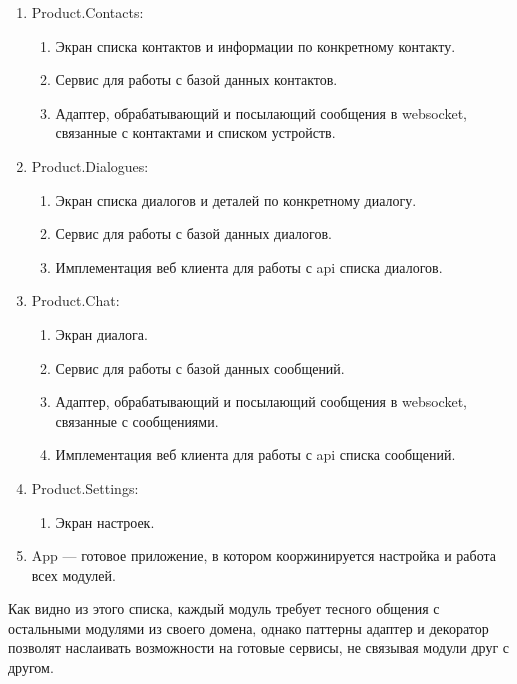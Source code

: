 \begin{enumerate}
	\item Product.Contacts:
	\begin{enumerate}
		\item Экран списка контактов и информации по конкретному контакту.
		\item Сервис для работы с базой данных контактов.
		\item Адаптер, обрабатывающий и посылающий сообщения в websocket, связанные с контактами и списком устройств.
	\end{enumerate}

	\item Product.Dialogues:
	\begin{enumerate}
		\item Экран списка диалогов и деталей по конкретному диалогу.
		\item Сервис для работы с базой данных диалогов.
		\item Имплементация веб клиента для работы с \gls{api} списка диалогов.
	\end{enumerate}

	\item Product.Chat:
	\begin{enumerate}
		\item Экран диалога.
		\item Сервис для работы с базой данных сообщений.
		\item Адаптер, обрабатывающий и посылающий сообщения в websocket, связанные с сообщениями.
		\item Имплементация веб клиента для работы с \gls{api} списка сообщений.
	\end{enumerate}

	\item Product.Settings:
	\begin{enumerate}
		\item Экран настроек.
	\end{enumerate}

	\item App --- готовое приложение, в котором кооржинируется настройка и работа всех модулей.

\end{enumerate}

Как видно из этого списка, каждый модуль требует тесного общения с остальными модулями из своего домена, однако паттерны адаптер и декоратор позволят наслаивать возможности на готовые сервисы, не связывая модули друг с другом.